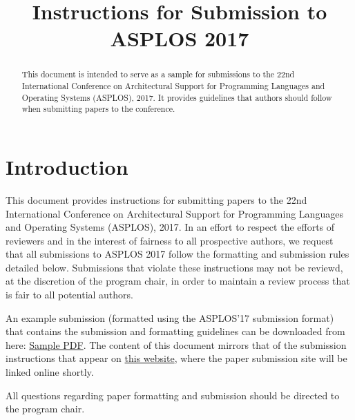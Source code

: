 \documentclass[pageno]{jpaper}
\begin{document}
\title{
Instructions for Submission to ASPLOS 2017}

\date{}
\maketitle

\thispagestyle{empty}

\begin{abstract}

This document is intended to serve as a sample for submissions to the
22nd International Conference on Architectural Support for Programming
Languages and Operating Systems (ASPLOS), 2017.  It provides
guidelines that authors should follow when submitting papers to the
conference.

\end{abstract}

\section{Introduction}

This document provides instructions for submitting papers to the 22nd
International Conference on Architectural Support for Programming
Languages and Operating Systems (ASPLOS), 2017.  In an effort to
respect the efforts of reviewers and in the interest of fairness to
all prospective authors, we request that all submissions to ASPLOS
2017 follow the formatting and submission rules detailed below.
Submissions that violate these instructions may not be reviewd, at the
discretion of the program chair, in order to maintain a review process
that is fair to all potential authors.

An example submission (formatted using the ASPLOS'17 submission
format) that contains the submission and formatting guidelines can be
downloaded from here:
\href{http://novel.ict.ac.cn/ASPLOS2017/files/asplos17-template.pdf}{Sample PDF}. The content of
this document mirrors that of the submission instructions that appear
on \href{http://novel.ict.ac.cn/ASPLOS2017/submission.html}{this
website}, where the paper submission site will be linked online
shortly.

All questions regarding paper formatting and submission should be directed
to the program chair.
\end{document}
